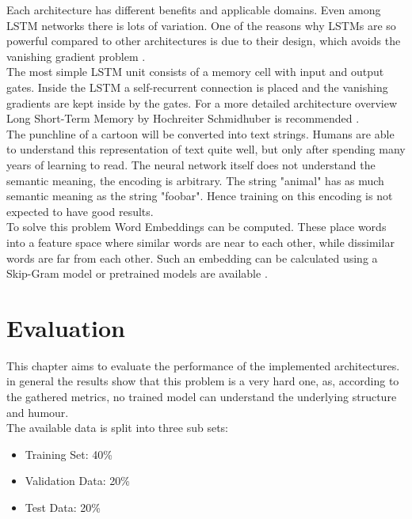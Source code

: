 \documentclass[draft,final,oneside]{vutinfth} %
\begin{document}
Each architecture has different benefits and applicable domains. Even among LSTM networks there is lots of variation. One of the reasons why LSTMs are so powerful compared to other architectures is due to their design, which avoids the vanishing gradient problem \cite {vanishinggradient}.\\

The most simple LSTM unit consists of a memory cell with input and output gates. Inside the LSTM a self-recurrent connection is placed and the vanishing gradients are kept inside by the gates. For a more detailed architecture overview Long Short-Term Memory by Hochreiter Schmidhuber is recommended \cite{hochreiter}. \\

The punchline of a cartoon will be converted into text strings. Humans are able to understand this representation of text quite well, but only after spending many years of learning to read. The neural network itself does not understand the semantic meaning, the encoding is arbitrary. The string "animal" has as much semantic meaning as the string "foobar". Hence training on this encoding is not expected to have good results. \\

To solve this problem Word Embeddings can be computed. These place words into a feature space where similar words are near to each other, while dissimilar words are far from each other. Such an embedding can be calculated using a Skip-Gram model \cite{wordembedding} or pretrained models are available \cite{pennington2014glove}.
\fi

\chapter{Evaluation}

This chapter aims to evaluate the performance of the implemented architectures. in
general the results show that this problem is a very hard one, as, according to the
gathered metrics, no trained model can understand the underlying structure and humour. \\

The available data is split into three sub sets:

\begin{itemize}
\item Training Set: 40\%
\item Validation Data: 20\%
\item Test Data: 20\%
\end{itemize}
\end{document}
